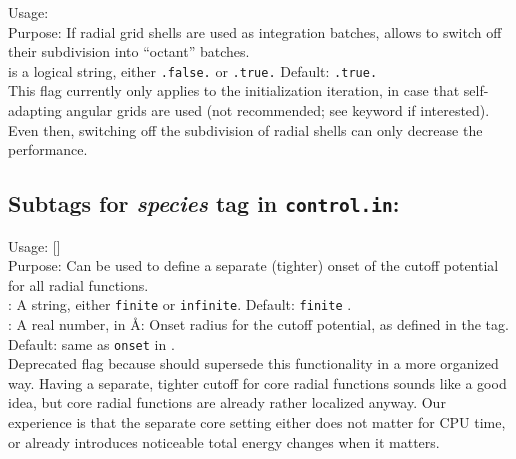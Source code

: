 {
  \noindent
  Usage:   \\[1.0ex]
  Purpose: If radial grid shells are used as integration batches,
    allows to switch off their subdivision into ``octant''
    batches. \\[1.0ex] 
   is a logical string, either \texttt{.false.} or
    \texttt{.true.} Default: \texttt{.true.} \\
}
This flag currently only applies to the initialization iteration, in
case that self-adapting angular grids are used (not recommended; see
keyword  if interested). Even then, switching
off the subdivision of radial shells can only decrease the
performance. 


\newpage

\subsection*{Subtags for \emph{species} tag in \texttt{control.in}:}

{
  \noindent
  Usage:   [] \\[1.0ex]
  Purpose: Can be used to define a separate (tighter) onset of the
    cutoff potential for all  radial functions. \\[1.0ex]  
   : A string, either \texttt{finite} or
    \texttt{infinite}. Default: \texttt{finite} . \\
   : A real number, in {\AA}: Onset radius for the
    cutoff potential, as defined in the 
    tag. Default: same as \texttt{onset} in .\\ 
}
Deprecated flag because  should
supersede this functionality in a more organized way. Having a
separate, tighter cutoff for core radial functions sounds like a good
idea, but core radial functions are already rather localized
anyway. Our experience is that the separate core setting either does
not matter for CPU time, or already introduces noticeable total energy
changes when it matters.
